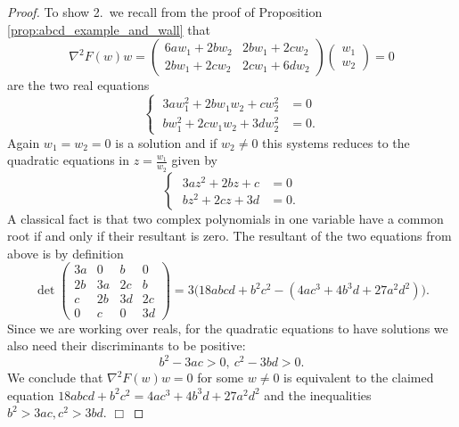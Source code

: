 \documentclass[10pt,a4paper]{amsart}
\newcommand{\proofend}{$\Box$\bigskip}
\begin{document}
\begin{proof}
To show 2.~we recall from the proof of Proposition \ref{prop:abcd_example_and_wall} that
\begin{equation}\nonumber
\nabla^2F(w)w=\begin{pmatrix}
6aw_1+2bw_2 & 2bw_1+2cw_2\\
2bw_1+2cw_2 & 2cw_1+6dw_2
\end{pmatrix}
\begin{pmatrix}
w_1\\
w_2
\end{pmatrix}
=0
\end{equation}
are the two real equations
\begin{equation}\nonumber
\left\{\;
\begin{aligned}
3aw_1^2+2bw_1w_2+cw_2^2&=0\\
bw_1^2+2cw_1w_2+3dw_2^2&=0.
\end{aligned}
\right.
\end{equation}
Again $w_1=w_2=0$ is a solution and if $w_2\neq0$ this systems reduces to the quadratic equations in $z=\frac{w_1}{w_2}$ given by
\begin{equation}\nonumber
\left\{\;
\begin{aligned}
3az^2+2bz+c&=0\\
bz^2+2cz+3d&=0.
\end{aligned}
\right.
\end{equation}
A classical fact is that two complex polynomials in one variable have a common root if and only if their resultant is zero. The resultant of the two equations from above is by definition
\begin{equation}\nonumber
\det
\begin{pmatrix}
3a & 0 & b & 0 \\
2b & 3a & 2c & b \\
c & 2b & 3d & 2c \\
0 & c  & 0 & 3d 
\end{pmatrix}=3\big(18abcd+b^2c^2-(4ac^3+4b^3d+27a^2d^2)\big).
\end{equation}
Since we are working over reals, for the quadratic equations to have solutions we also need their discriminants to be positive:
$$
b^2 - 3ac > 0,\ c^2 - 3bd > 0. 
$$ 
We conclude that $\nabla^2F(w)w=0$ for some $w\neq0$ is equivalent to the claimed equation $18abcd+b^2c^2=4ac^3+4b^3d+27a^2d^2$ and the inequalities $b^2>3ac, c^2>3bd$.
\proofend 
\end{proof}
\end{document}
